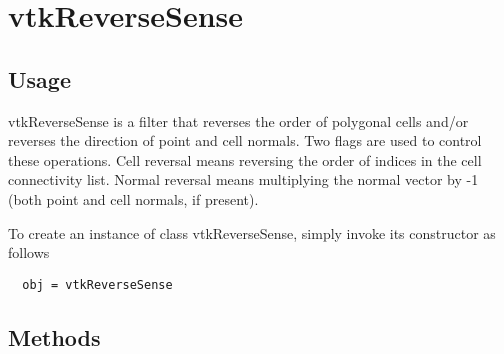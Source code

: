 \section{vtkReverseSense}

\subsection{Usage}

 
 vtkReverseSense is a filter that reverses the order of polygonal cells
 and/or reverses the direction of point and cell normals. Two flags are
 used to control these operations. Cell reversal means reversing the order
 of indices in the cell connectivity list. Normal reversal means
 multiplying the normal vector by -1 (both point and cell normals, 
 if present).

To create an instance of class vtkReverseSense, simply
invoke its constructor as follows
\begin{verbatim}
  obj = vtkReverseSense
\end{verbatim}
\subsection{Methods}


